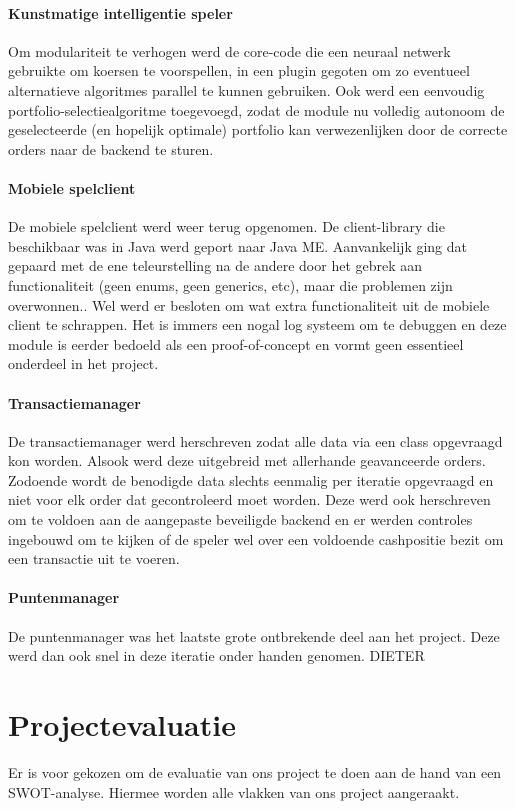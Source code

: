 \subsubsection{Kunstmatige intelligentie speler}
Om modulariteit te verhogen werd de core-code die een neuraal netwerk gebruikte om koersen te voorspellen, in een plugin gegoten om zo eventueel alternatieve algoritmes parallel te kunnen gebruiken. Ook werd een eenvoudig portfolio-selectiealgoritme toegevoegd, zodat de module nu volledig autonoom de geselecteerde (en hopelijk optimale) portfolio kan verwezenlijken door de correcte orders naar de backend te sturen.

\subsubsection{Mobiele spelclient}
De mobiele spelclient werd weer terug opgenomen. De client-library die beschikbaar was in Java werd geport naar Java ME. Aanvankelijk ging dat gepaard met de ene teleurstelling na de andere door het gebrek aan functionaliteit (geen enums, geen generics, etc), maar die problemen zijn overwonnen.. Wel werd er besloten om wat extra functionaliteit uit de mobiele client te schrappen. Het is immers een nogal log systeem om te debuggen en deze module is eerder bedoeld als een proof-of-concept en vormt geen essentieel onderdeel in het project.

\subsubsection{Transactiemanager}
De transactiemanager werd herschreven zodat alle data via een class opgevraagd kon worden. Alsook werd deze uitgebreid met allerhande geavanceerde orders.
Zodoende wordt de benodigde data slechts eenmalig per iteratie opgevraagd en niet voor elk order dat gecontroleerd moet worden. Deze werd ook herschreven om te voldoen aan de aangepaste beveiligde backend en er werden controles ingebouwd om te kijken of de speler wel over een voldoende cashpositie bezit om een transactie uit te voeren.

\subsubsection{Puntenmanager}
De puntenmanager was het laatste grote ontbrekende deel aan het project. Deze werd dan ook snel in deze iteratie onder handen genomen.
\todo DIETER


\chapter{Projectevaluatie}
Er is voor gekozen om de evaluatie van ons project te doen aan de hand van een SWOT-analyse. Hiermee worden alle vlakken van ons project aangeraakt.

